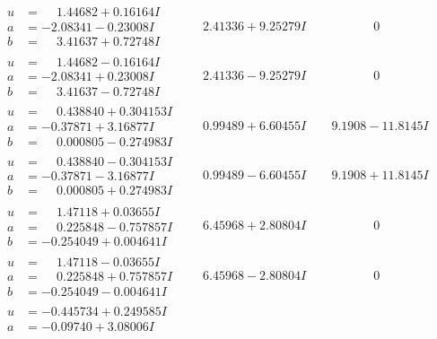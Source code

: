 \documentclass[1p]{elsarticle_modified}
\theoremstyle{definition}
\begin{document}
$$\begin{array}{c|c|c}
 \hline 
\begin{aligned}
u &= \phantom{-}1.44682 + 0.16164 I \\
a &= -2.08341 - 0.23008 I \\
b &= \phantom{-}3.41637 + 0.72748 I\end{aligned}
 & \phantom{-}2.41336 + 9.25279 I & \phantom{-0.000000 } 0 \\ \hline\begin{aligned}
u &= \phantom{-}1.44682 - 0.16164 I \\
a &= -2.08341 + 0.23008 I \\
b &= \phantom{-}3.41637 - 0.72748 I\end{aligned}
 & \phantom{-}2.41336 - 9.25279 I & \phantom{-0.000000 } 0 \\ \hline\begin{aligned}
u &= \phantom{-}0.438840 + 0.304153 I \\
a &= -0.37871 + 3.16877 I \\
b &= \phantom{-}0.000805 - 0.274983 I\end{aligned}
 & \phantom{-}0.99489 + 6.60455 I & \phantom{-}9.1908 - 11.8145 I \\ \hline\begin{aligned}
u &= \phantom{-}0.438840 - 0.304153 I \\
a &= -0.37871 - 3.16877 I \\
b &= \phantom{-}0.000805 + 0.274983 I\end{aligned}
 & \phantom{-}0.99489 - 6.60455 I & \phantom{-}9.1908 + 11.8145 I \\ \hline\begin{aligned}
u &= \phantom{-}1.47118 + 0.03655 I \\
a &= \phantom{-}0.225848 - 0.757857 I \\
b &= -0.254049 + 0.004641 I\end{aligned}
 & \phantom{-}6.45968 + 2.80804 I & \phantom{-0.000000 } 0 \\ \hline\begin{aligned}
u &= \phantom{-}1.47118 - 0.03655 I \\
a &= \phantom{-}0.225848 + 0.757857 I \\
b &= -0.254049 - 0.004641 I\end{aligned}
 & \phantom{-}6.45968 - 2.80804 I & \phantom{-0.000000 } 0 \\ \hline\begin{aligned}
u &= -0.445734 + 0.249585 I \\
a &= -0.09740 + 3.08006 I \\

\end{aligned}
\end{array}$$
\end{document}
